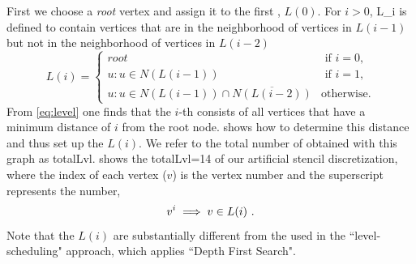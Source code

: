 First we choose a \emph{root} vertex and assign it to the
first \level, $L(0)$\@. For $i>0$, \level \acrshort{L_i}
is defined to contain vertices that are in the neighborhood of vertices
in $L(i-1)$ but not in the neighborhood of vertices
in $L(i-2)$ \cite{BFS_level_def} \ie
\begin{equation}\label{eq:level}
L(i) = 
\begin{cases}
	 root & \text{ if } i = 0, \\
	 u : u \in N(L(i-1))  & \text{ if } i = 1, \\
	 u : u \in N(L(i-1)) \cap \overline{N(L(i-2))}  & \text{otherwise}.
\end{cases}   
\end{equation}
From \cref{eq:level} one finds that the $i$-th \level consists of all
vertices that have a minimum distance of $i$ from the root node.
 shows how to determine this distance and thus set up the
\levels $L(i)$\@. We refer to the total number of \levels obtained with this graph
as \acrshort{totalLvl}.  shows the
\acrshort{totalLvl}=14 \levels of our artificial stencil
discretization, where the index of each vertex ($v$) is the
vertex number and the superscript represents the \level number, \ie
\begin{equation}\label{eq:node_notation}
	v^i \implies v \in L(i)\eos
\end{equation}
Note that the $L(i)$ are  substantially different from the \levels used in
the ``level-scheduling" \cite{saad} approach, which applies ``Depth First
Search".

\setlength{\fboxsep}{0pt}%

